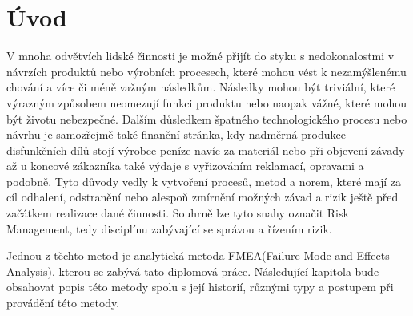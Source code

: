 \chapter{Úvod}
\label{sec:Uvod}
V mnoha odvětvích lidské činnosti je možné přijít do styku s nedokonalostmi v návrzích produktů nebo výrobních procesech, které mohou vést k nezamýšlenému chování a více či méně važným následkům. Následky mohou být triviální, které výrazným způsobem neomezují funkci produktu nebo naopak vážné, které mohou být životu nebezpečné. Dalším důsledkem špatného technologického procesu nebo návrhu je samozřejmě také finanční stránka, kdy nadměrná produkce disfunkčních dílů stojí výrobce peníze navíc za materiál nebo při objevení závady až u koncové zákazníka také výdaje s vyřizováním reklamací, opravami a podobně. Tyto důvody vedly k vytvoření procesů, metod a norem, které mají za cíl odhalení, odstranění nebo alespoň zmírnění možných závad a rizik ještě před začátkem realizace dané činnosti. Souhrně lze tyto snahy označit Risk Management, tedy disciplínu zabývající se správou a řízením rizik. 

Jednou z těchto metod je analytická metoda FMEA(Failure Mode and Effects Analysis), kterou se zabývá tato diplomová práce. Následující kapitola bude obsahovat popis této metody spolu s její historií, různými typy a postupem při provádění této metody. 


\endinput